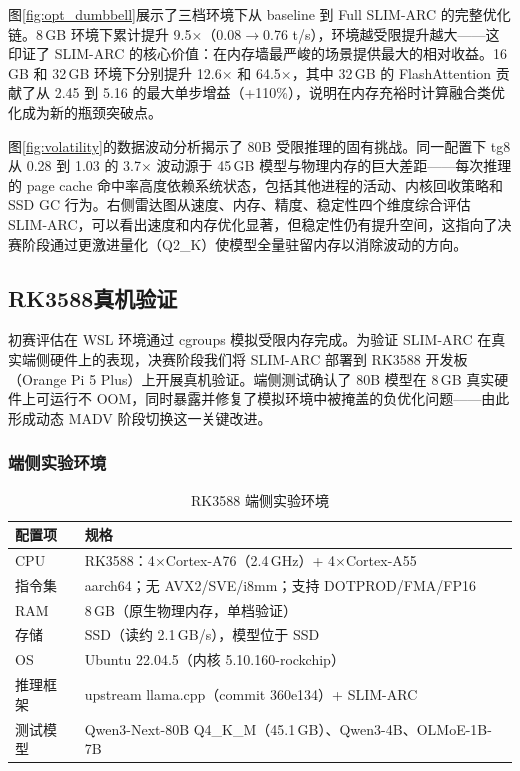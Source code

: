 图\ref{fig:opt_dumbbell}展示了三档环境下从 baseline 到 Full SLIM-ARC 的完整优化链。8\,GB 环境下累计提升 9.5$\times$（0.08$\to$0.76 t/s），环境越受限提升越大——这印证了 SLIM-ARC 的核心价值：在内存墙最严峻的场景提供最大的相对收益。16\,GB 和 32\,GB 环境下分别提升 12.6$\times$ 和 64.5$\times$，其中 32\,GB 的 FlashAttention 贡献了从 2.45 到 5.16 的最大单步增益（+110\%），说明在内存充裕时计算融合类优化成为新的瓶颈突破点。

图\ref{fig:volatility}的数据波动分析揭示了 80B 受限推理的固有挑战。同一配置下 tg8 从 0.28 到 1.03 的 3.7$\times$ 波动源于 45\,GB 模型与物理内存的巨大差距——每次推理的 page cache 命中率高度依赖系统状态，包括其他进程的活动、内核回收策略和 SSD GC 行为。右侧雷达图从速度、内存、精度、稳定性四个维度综合评估 SLIM-ARC，可以看出速度和内存优化显著，但稳定性仍有提升空间，这指向了决赛阶段通过更激进量化（Q2\_K）使模型全量驻留内存以消除波动的方向。

\subsection{RK3588真机验证}

初赛评估在 WSL 环境通过 cgroups 模拟受限内存完成。为验证 SLIM-ARC 在真实端侧硬件上的表现，决赛阶段我们将 SLIM-ARC 部署到 RK3588 开发板（Orange Pi 5 Plus）上开展真机验证。端侧测试确认了 80B 模型在 8\,GB 真实硬件上可运行不 OOM，同时暴露并修复了模拟环境中被掩盖的负优化问题——由此形成动态 MADV 阶段切换这一关键改进。

\subsubsection{端侧实验环境}

\begin{table}[H]
    \centering
    \caption{RK3588 端侧实验环境}
    \label{tab:edge_env}
    \begin{tabular}{ll}
        \toprule
        \textbf{配置项} & \textbf{规格} \\
        \midrule
        CPU & RK3588：4$\times$Cortex-A76（2.4\,GHz）+ 4$\times$Cortex-A55 \\
        指令集 & aarch64；无 AVX2/SVE/i8mm；支持 DOTPROD/FMA/FP16 \\
        RAM & 8\,GB（原生物理内存，单档验证） \\
        存储 & SSD（读约 2.1\,GB/s），模型位于 SSD \\
        OS & Ubuntu 22.04.5（内核 5.10.160-rockchip） \\
        推理框架 & upstream llama.cpp（commit 360e134）+ SLIM-ARC \\
        测试模型 & Qwen3-Next-80B Q4\_K\_M（45.1\,GB）、Qwen3-4B、OLMoE-1B-7B \\
        \bottomrule
    \end{tabular}
\end{table}

